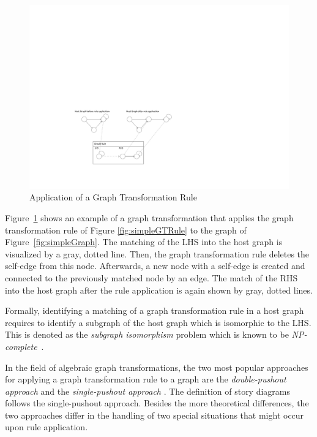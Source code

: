 \begin{figure}[htbp]
  \centering
  \includegraphics[width=\linewidth]{figures/GTApplication}
  \caption{Application of a Graph Transformation Rule}
  \label{fig:GTApplication}
\end{figure}

Figure~\ref{fig:GTApplication} shows an example of a graph transformation that applies the graph transformation rule of Figure \ref{fig:simpleGTRule} to the graph of Figure~\ref{fig:simpleGraph}. The matching of the LHS into the host graph is visualized by a gray, dotted line. Then, the graph transformation rule deletes the self-edge from this node. Afterwards, a new node with a self-edge is created and connected to the previously matched node by an edge. The match of the RHS into the host graph after the rule application is again shown by gray, dotted lines.

Formally, identifying a matching of a graph transformation rule in a host graph requires to identify a subgraph of the host graph which is isomorphic to the LHS. This is denoted as the \emph{subgraph isomorphism} problem which is known to be \emph{NP-complete}~\cite{Epp95}. 

In the field of algebraic graph transformations, the two most popular approaches for applying a graph transformation rule to a graph are the
\emph{double-pushout approach} \cite{Roz97} and the \emph{single-pushout
approach} \cite{Roz97}. The definition of story diagrams follows the
single-pushout approach. Besides the more theoretical differences, the two
approaches differ in the handling of two special situations that might occur
upon rule application.

